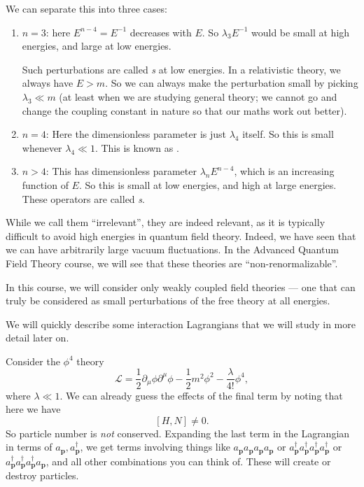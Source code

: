\documentclass[a4paper]{article}
\begin{document}
We can separate this into three cases:
\begin{enumerate}
  \item $n = 3$: here $E^{n - 4} = E^{-1}$ decreases with $E$. So $\lambda_3 E^{-1}$ would be small at high energies, and large at low energies.


    Such perturbations are called \emph{s} at low energies. In a relativistic theory, we always have $E > m$. So we can always make the perturbation small by picking $\lambda_3 \ll m$ (at least when we are studying general theory; we cannot go and change the coupling constant in nature so that our maths work out better).

  \item $n = 4$: Here the dimensionless parameter is just $\lambda_4$ itself. So this is small whenever $\lambda_4 \ll 1$. This is known as .

  \item $n > 4$: This has dimensionless parameter $\lambda_n E^{n - 4}$, which is an increasing function of $E$. So this is small at low energies, and high at large energies. These operators are called \emph{s}.
\end{enumerate}
While we call them ``irrelevant'', they are indeed relevant, as it is typically difficult to avoid high energies in quantum field theory. Indeed, we have seen that we can have arbitrarily large vacuum fluctuations. In the Advanced Quantum Field Theory course, we will see that these theories are ``non-renormalizable''.

In this course, we will consider only weakly coupled field theories --- one that can truly be considered as small perturbations of the free theory at all energies.

We will quickly describe some interaction Lagrangians that we will study in more detail later on.
\begin{eg}
  Consider the $\phi^4$ theory
  \[
    \mathcal{L} = \frac{1}{2} \partial_\mu \phi \partial^\mu \phi - \frac{1}{2}m^2 \phi^2 - \frac{\lambda}{4!}\phi^4,
  \]
  where $\lambda \ll 1$. We can already guess the effects of the final term by noting that here we have
  \[
    [H, N] \not= 0.
  \]
  So particle number is \emph{not} conserved. Expanding the last term in the Lagrangian in terms of $a_\mathbf{p}, a_\mathbf{p}^\dagger$, we get terms involving things like $a_\mathbf{p} a_\mathbf{p} a_\mathbf{p} a_\mathbf{p}$ or $a_\mathbf{p}^\dagger a_\mathbf{p}^\dagger a_\mathbf{p}^\dagger a_\mathbf{p}^\dagger$ or $a_\mathbf{p}^\dagger a_\mathbf{p}^\dagger a_\mathbf{p}^\dagger a_\mathbf{p}$, and all other combinations you can think of. These will create or destroy particles.
\end{eg}
\end{document}
